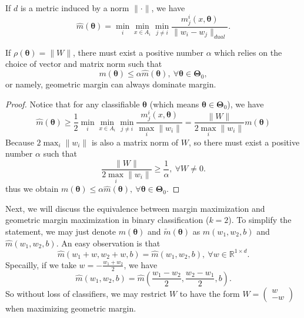 \begin{lemma}
	If $d$ is a metric induced by a norm $\|\cdot\|$, we have
	\begin{equation}
	\widehat{m}(\bm\theta) =  \min_{i} \min_{x\in A_i} \min_{j\neq i} \frac{m_j^i(x,\bm\theta)}{\|w_i-w_j\|_{dual}}.
	\end{equation}
\end{lemma}

\begin{lemma}
	If $\rho(\bm\theta) = \|W\|$, there must exist a positive number $\alpha$ which relies on the choice of vector and matrix norm such that 
	\begin{equation}
		m(\bm\theta) \leq \alpha \widehat{m}(\bm\theta), \ \forall \bm\theta\in \bm\Theta_0,
	\end{equation}
	or namely, geometric margin can always dominate margin.
\end{lemma}
\begin{proof}
	Notice that for any classifiable $\bm\theta$ (which means $\bm\theta\in\bm\Theta_0$), we have
	\begin{equation}
		\widehat{m}(\bm\theta) \geq \frac{1}{2} \min_{i} \min_{x\in A_i} \min_{j\neq i} \frac{m_j^i(x,\bm\theta)}{\max_i \|w_i\|} = \frac{\|W\|}{2\max_i \|w_i\|} m(\bm\theta)
	\end{equation}
	Because $2\max_i \|w_i\|$ is also a matrix norm of $W$, so there must exist a positive number $\alpha$ such that 
	\begin{equation}
		\frac{\|W\|}{2\max_i \|w_i\|} \geq \frac{1}{\alpha},\ \forall W\neq 0.
	\end{equation}
	thus we obtain $m(\bm\theta) \leq \alpha \widehat{m}(\bm\theta), \ \forall \bm\theta\in \bm\Theta_0$.
\end{proof}


Next, we will discuss the equivalence between margin maximization and geometric margin maximization in binary classification ($k = 2$). To simplify the statement, we may just denote $m(\bm\theta)$ and $\tilde{m}(\bm\theta)$ as $m(w_1,w_2,b)$ and $\widehat{m}(w_1,w_2,b)$. An easy observation is that
\begin{equation}
	\widehat{m}(w_1+w,w_2+w,b) = \widehat{m}(w_1,w_2,b),\ \forall w\in \mathbb{R}^{1\times d}.
\end{equation}
Specailly, if we take $w = -\frac{w_1+w_2}{2}$, we have
\begin{equation}
\widehat{m}(w_1,w_2,b) = \widehat{m}(\frac{w_1-w_2}{2},\frac{w_2-w_1}{2},b).
\end{equation}
So without loss of classifiers, we may restrict $W$ to have the form $W = \begin{pmatrix}
w\\
-w
\end{pmatrix}$ when maximizing geometric margin. 


